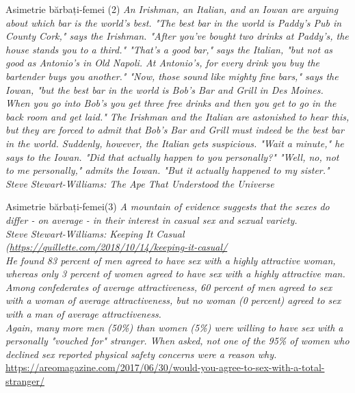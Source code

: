 \documentclass{simple}
\begin{document}
\begin{frame}{Asimetrie bărbați-femei (2)}
  \textit{An Irishman, an Italian, and an Iowan are arguing about which bar is the world's best. "The best bar in the world is Paddy's Pub in County Cork," says the Irishman. "After you've bought two drinks at Paddy's, the house stands you to a third." "That's a good bar," says the Italian, "but not as good as Antonio's in Old Napoli. At Antonio's, for every drink you buy the bartender buys you another." "Now, those sound like mighty fine bars," says the Iowan, "but the best bar in the world is Bob's Bar and Grill in Des Moines. When you go into Bob's you get three free drinks and then you get to go in the back room and get laid." The Irishman and the Italian are astonished to hear this, but they are forced to admit that Bob's Bar and Grill must indeed be the best bar in the world. Suddenly, however, the Italian gets suspicious. "Wait a minute," he says to the Iowan. "Did that actually happen to you personally?" "Well, no, not to me personally," admits the Iowan. "But it actually happened to my sister."}\\
  \hfill \textit{Steve Stewart-Williams: The Ape That Understood the Universe}
\end{frame}

\begin{frame}{Asimetrie bărbați-femei(3)}
  \pause
  \textit{A mountain of evidence suggests that the sexes do differ - on average - in their interest in casual sex and sexual variety.} \\
  \hfill \textit{Steve Stewart-Williams: Keeping It Casual (\url{https://quillette.com/2018/10/14/keeping-it-casual/}} \\
  \vspace{0.5cm}
  \pause
  \textit{He found 83 percent of men agreed to have sex with a highly attractive woman, whereas only 3 percent of women agreed to have sex with a highly attractive man. Among confederates of average attractiveness, 60 percent of men agreed to sex with a woman of average attractiveness, but no woman (0 percent) agreed to sex with a man of average attractiveness.} \\
  \pause
  \textit{Again, many more men (50\%) than women (5\%) were willing to have sex with a personally "vouched for" stranger. When asked, not one of the 95\% of women who declined sex reported physical safety concerns were a reason why.}
  \pause
  \hfill \url{https://areomagazine.com/2017/06/30/would-you-agree-to-sex-with-a-total-stranger/}
\end{frame}
\end{document}
